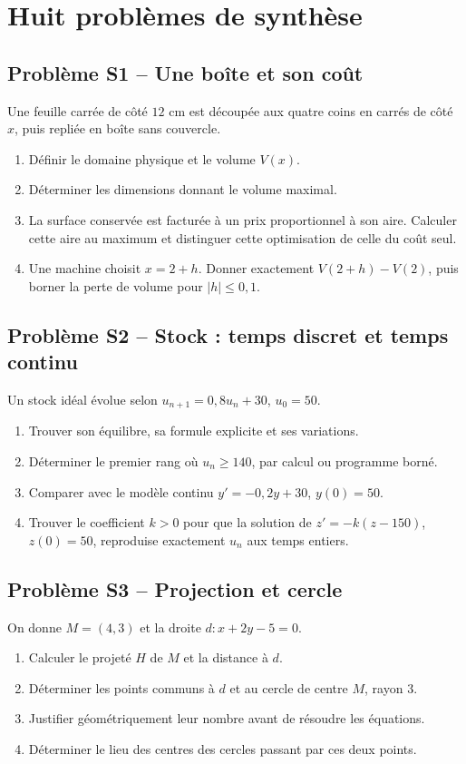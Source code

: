 \chapter{Huit problèmes de synthèse}
\section*{Problème S1 -- Une boîte et son coût}

Une feuille carrée de côté $12$ cm est découpée aux quatre coins en carrés
de côté $x$, puis repliée en boîte sans couvercle.
\begin{enumerate}
\item Définir le domaine physique et le volume $V(x)$.
\item Déterminer les dimensions donnant le volume maximal.
\item La surface conservée est facturée à un prix proportionnel à son aire.
Calculer cette aire au maximum et distinguer cette optimisation de celle du coût seul.
\item Une machine choisit $x=2+h$. Donner exactement $V(2+h)-V(2)$,
puis borner la perte de volume pour $|h|\le0{,}1$.
\end{enumerate}

\section*{Problème S2 -- Stock : temps discret et temps continu}

Un stock idéal évolue selon $u_{n+1}=0{,}8u_n+30$, $u_0=50$.
\begin{enumerate}
\item Trouver son équilibre, sa formule explicite et ses variations.
\item Déterminer le premier rang où $u_n\ge140$, par calcul ou programme borné.
\item Comparer avec le modèle continu $y'=-0{,}2y+30$, $y(0)=50$.
\item Trouver le coefficient $k>0$ pour que la solution de
$z'=-k(z-150)$, $z(0)=50$, reproduise exactement $u_n$ aux temps entiers.
\end{enumerate}

\section*{Problème S3 -- Projection et cercle}

On donne $M=(4,3)$ et la droite $d:x+2y-5=0$.
\begin{enumerate}
\item Calculer le projeté $H$ de $M$ et la distance à $d$.
\item Déterminer les points communs à $d$ et au cercle de centre $M$, rayon $3$.
\item Justifier géométriquement leur nombre avant de résoudre les équations.
\item Déterminer le lieu des centres des cercles passant par ces deux points.
\end{enumerate}

